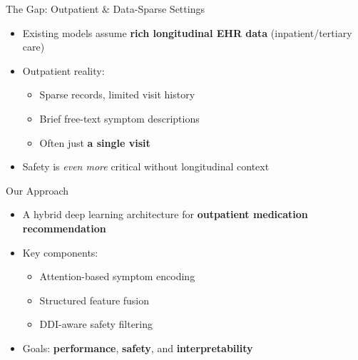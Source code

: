 \begin{frame}{The Gap: Outpatient \& Data-Sparse Settings}
  \begin{itemize}
    \item Existing models assume \textbf{rich longitudinal EHR data} (inpatient/tertiary care)
    \pause
    \item Outpatient reality:
    \begin{itemize}
      \item Sparse records, limited visit history
      \item Brief free-text symptom descriptions
      \item Often just \textbf{a single visit}
    \end{itemize}
    \pause
    \item Safety is \emph{even more} critical without longitudinal context
  \end{itemize}
\end{frame}

\begin{frame}{Our Approach}
  \begin{itemize}
    \item A hybrid deep learning architecture for \textbf{outpatient medication recommendation}
    \pause
    \item Key components:
    \begin{itemize}
      \item Attention-based symptom encoding
      \item Structured feature fusion
      \item DDI-aware safety filtering
    \end{itemize}
    \pause
    \item Goals: \textbf{performance}, \textbf{safety}, and \textbf{interpretability}
  \end{itemize}
\end{frame}
